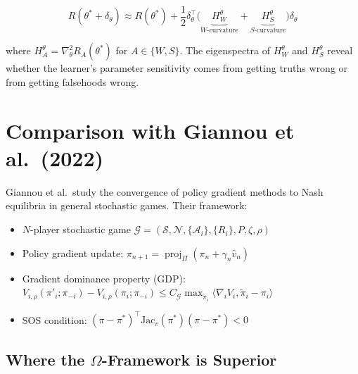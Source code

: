 \documentclass[11pt,a4paper]{article}
\DeclareMathOperator{\proj}{proj}
\begin{document}
\begin{equation}
R(\theta^* + \delta_\theta) \approx R(\theta^*) + \frac{1}{2}\delta_\theta^\top \Big(\underbrace{H_W^\theta}_{W\text{-curvature}} + \underbrace{H_S^\theta}_{S\text{-curvature}}\Big) \delta_\theta
\label{eq:param-taylor}
\end{equation}

where $H_A^\theta = \nabla^2_\theta R_A(\theta^*)$ for $A \in \{W, S\}$. The eigenspectra of $H_W^\theta$ and $H_S^\theta$ reveal whether the learner's parameter sensitivity comes from getting truths wrong or from getting falsehoods wrong.


\newpage
\section{Comparison with Giannou et al.\ (2022)}
\label{sec:giannou}

Giannou et al.\ study the convergence of policy gradient methods to Nash equilibria in general stochastic games. Their framework:

\begin{itemize}[nosep]
\item $N$-player stochastic game $\mathcal{G} = (\mathcal{S}, \mathcal{N}, \{\mathcal{A}_i\}, \{R_i\}, P, \zeta, \rho)$
\item Policy gradient update: $\pi_{n+1} = \proj_\Pi(\pi_n + \gamma_n \hat{v}_n)$
\item Gradient dominance property (GDP): $V_{i,\rho}(\pi'_i; \pi_{-i}) - V_{i,\rho}(\pi_i; \pi_{-i}) \leq C_\mathcal{G} \max_{\tilde\pi_i} \langle \nabla_i V_i, \tilde\pi_i - \pi_i \rangle$
\item SOS condition: $(\pi - \pi^*)^\top \text{Jac}_v(\pi^*)(\pi - \pi^*) < 0$
\end{itemize}

\subsection{Where the $\Omega$-Framework is Superior}
\end{document}
